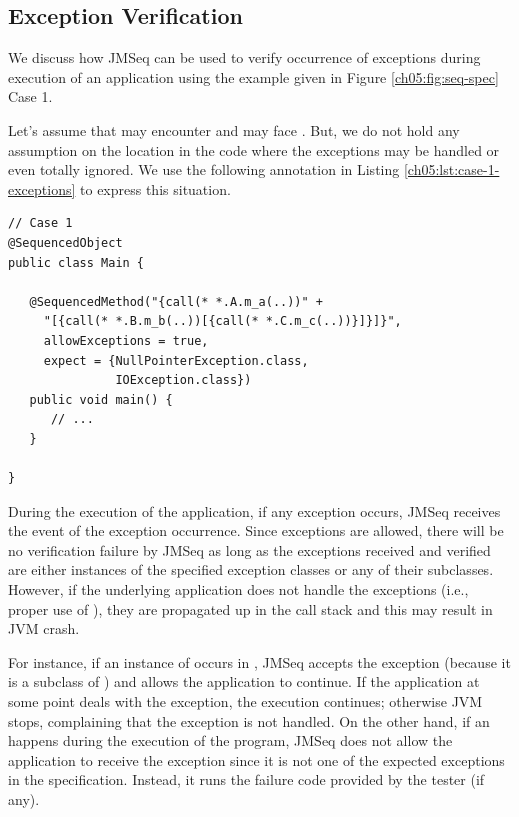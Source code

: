 \subsection{Exception Verification}
We discuss how JMSeq can be used to verify  occurrence of exceptions during
execution of an application using the example given in Figure
\ref{ch05:fig:seq-spec} Case 1.

Let's assume that  may encounter
 and  may face
. But, we do not hold any assumption on the
location in the code where the exceptions may be handled or even
totally ignored. We use the following annotation in Listing
\ref{ch05:lst:case-1-exceptions} to express this situation.

\lstset{language=Java}
\begin{lstlisting}[label=ch05:lst:case-1-exceptions, caption=Exception
Specification for Case 1]
// Case 1
@SequencedObject
public class Main {

   @SequencedMethod("{call(* *.A.m_a(..))" + 
     "[{call(* *.B.m_b(..))[{call(* *.C.m_c(..))}]}]}",
     allowExceptions = true,
     expect = {NullPointerException.class, 
               IOException.class}) 
   public void main() { 
      // ...
   }

}
\end{lstlisting}

During the execution of the application, if any exception occurs,
JMSeq receives the event of the exception occurrence. Since exceptions
are allowed, there will be no verification failure by JMSeq as long as
the exceptions received and verified are either instances of the
specified exception classes or any of their subclasses.
However, if the underlying application does not handle the exceptions
(i.e., proper use of ), they are
propagated up in the call stack and this may result in JVM crash.

For instance, if an instance of  occurs
in , JMSeq accepts the exception (because it is a subclass of
) and allows the application to continue. If the
application at some point deals with the exception, the execution
continues; otherwise JVM stops, complaining that the exception is not handled.
On the other hand, if an 
happens during the execution of the program, JMSeq does not allow the
application to receive the exception since it is not one of the expected
exceptions in the specification. 
Instead, it runs the failure code provided by the tester (if any).

